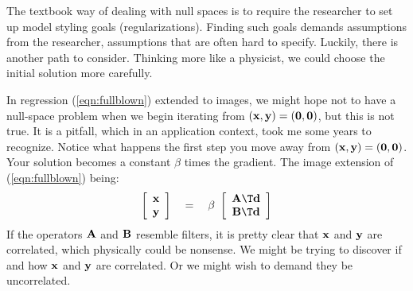 \par
The textbook way of dealing with null spaces is to require
the researcher to set up model styling goals (regularizations).
Finding such goals demands assumptions from the researcher,
assumptions that are often hard to specify.
Luckily,
there is another path to consider.
Thinking more like a physicist, we could choose the initial solution more carefully.

In regression
(\ref{eqn:fullblown})
extended to images,
we might hope not to have a null-space problem
when we begin iterating from
$(\bold x,\bold y) =(\bold 0,\bold 0)$,
but this is not true.
It is a pitfall,
which in an application context,
took me some years to recognize.
Notice what happens the first step you move away from
$(\bold x,\bold y) =(\bold 0,\bold 0)$.
Your solution becomes a constant $\beta$ times the gradient.
The image extension of (\ref{eqn:fullblown})
being:
\begin{equation}
\label{eqn:firststep}
\left[
	\begin{array}{c}
		\bold x \\ \bold y
	\end{array}
\right]
\quad=\quad
\beta\ 
\left[
	\begin{array}{c}
		\bold A\T \bold d
		\\
		\bold B\T \bold d
	\end{array}
\right]
\end{equation}
If the operators
$\bold A$ and
$\bold B$ resemble filters,
it is pretty clear that
$\bold x$ and $\bold y$ are correlated,
which physically could be nonsense.
We might be trying to discover if and how
$\bold x$ and $\bold y$ are correlated.
Or we might wish to demand they be uncorrelated.

